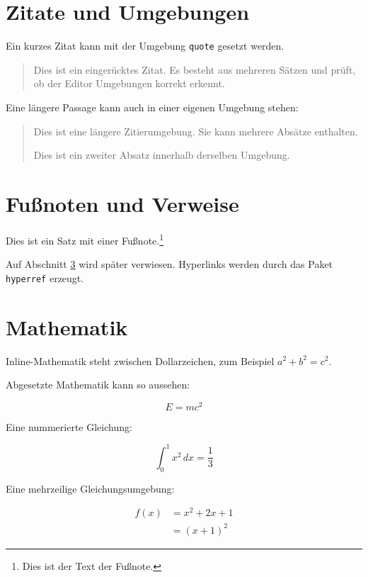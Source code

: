 \documentclass[a4paper,12pt]{article}
\begin{document}
	\section{Zitate und Umgebungen}

	Ein kurzes Zitat kann mit der Umgebung \texttt{quote} gesetzt werden.

	\begin{quote}
		Dies ist ein eingerücktes Zitat. Es besteht aus mehreren Sätzen und prüft,
		ob der Editor Umgebungen korrekt erkennt.
	\end{quote}

	Eine längere Passage kann auch in einer eigenen Umgebung stehen:

	\begin{quotation}
		Dies ist eine längere Zitierumgebung. Sie kann mehrere Absätze enthalten.

		Dies ist ein zweiter Absatz innerhalb derselben Umgebung.
	\end{quotation}

	\section{Fußnoten und Verweise}

	Dies ist ein Satz mit einer Fußnote.\footnote{Dies ist der Text der Fußnote.}

	Auf Abschnitt \ref{sec:mathematik} wird später verwiesen. Hyperlinks werden
	durch das Paket \texttt{hyperref} erzeugt.

	\section{Mathematik}
	\label{sec:mathematik}

	Inline-Mathematik steht zwischen Dollarzeichen, zum Beispiel $a^2 + b^2 = c^2$.

	Abgesetzte Mathematik kann so aussehen:

	\[
	E = mc^2
	\]

	Eine nummerierte Gleichung:

	\begin{equation}
		\int_0^1 x^2 \, dx = \frac{1}{3}
	\end{equation}

	Eine mehrzeilige Gleichungsumgebung:

	\begin{align}
		f(x) &= x^2 + 2x + 1 \\
		&= (x + 1)^2
	\end{align}
\end{document}
